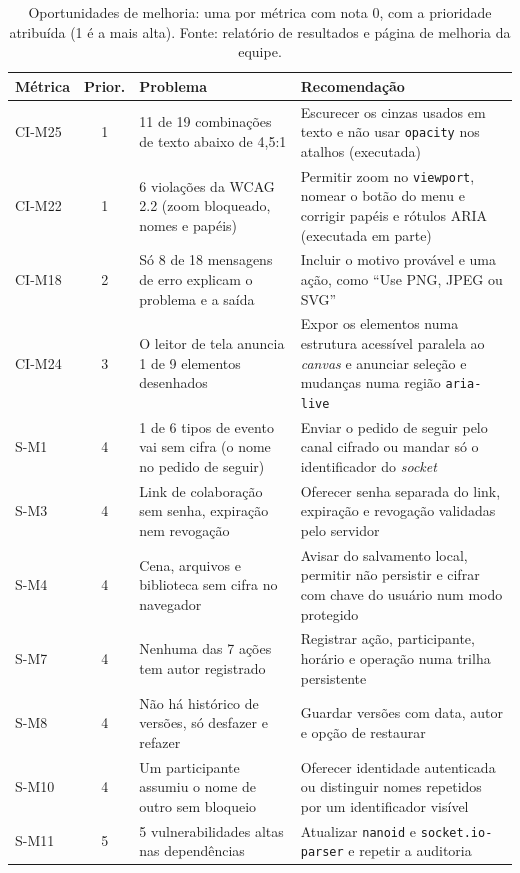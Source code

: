 \documentclass[conference]{IEEEtran}
\begin{document}
\begin{table}[!t]
\caption{Oportunidades de melhoria: uma por métrica com nota 0, com a prioridade atribuída (1 é a mais alta). Fonte: relatório de resultados e página de melhoria da equipe.}
\label{tab:oport}
\centering
\scriptsize
\setlength{\tabcolsep}{3pt}
\renewcommand{\arraystretch}{0.95}
\begin{tabular}{@{}L{1.15cm} c L{6.3cm} L{8.3cm}@{}}
\toprule
\textbf{Métrica} & \textbf{Prior.} & \textbf{Problema} & \textbf{Recomendação}\\
\midrule
CI-M25 & 1 & 11 de 19 combinações de texto abaixo de 4,5:1 & Escurecer os cinzas usados em texto e não usar \texttt{opacity} nos atalhos (executada)\\
CI-M22 & 1 & 6 violações da WCAG 2.2 (zoom bloqueado, nomes e papéis) & Permitir zoom no \texttt{viewport}, nomear o botão do menu e corrigir papéis e rótulos ARIA (executada em parte)\\
CI-M18 & 2 & Só 8 de 18 mensagens de erro explicam o problema e a saída & Incluir o motivo provável e uma ação, como ``Use PNG, JPEG ou SVG''\\
CI-M24 & 3 & O leitor de tela anuncia 1 de 9 elementos desenhados & Expor os elementos numa estrutura acessível paralela ao \textit{canvas} e anunciar seleção e mudanças numa região \texttt{aria-live}\\
S-M1 & 4 & 1 de 6 tipos de evento vai sem cifra (o nome no pedido de seguir) & Enviar o pedido de seguir pelo canal cifrado ou mandar só o identificador do \textit{socket}\\
S-M3 & 4 & Link de colaboração sem senha, expiração nem revogação & Oferecer senha separada do link, expiração e revogação validadas pelo servidor\\
S-M4 & 4 & Cena, arquivos e biblioteca sem cifra no navegador & Avisar do salvamento local, permitir não persistir e cifrar com chave do usuário num modo protegido\\
S-M7 & 4 & Nenhuma das 7 ações tem autor registrado & Registrar ação, participante, horário e operação numa trilha persistente\\
S-M8 & 4 & Não há histórico de versões, só desfazer e refazer & Guardar versões com data, autor e opção de restaurar\\
S-M10 & 4 & Um participante assumiu o nome de outro sem bloqueio & Oferecer identidade autenticada ou distinguir nomes repetidos por um identificador visível\\
S-M11 & 5 & 5 vulnerabilidades altas nas dependências & Atualizar \texttt{nanoid} e \texttt{socket.io-parser} e repetir a auditoria\\

\end{tabular}
\end{table}
\end{document}
